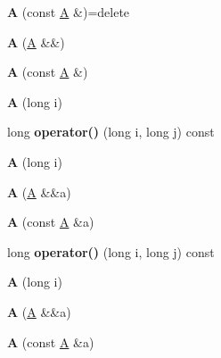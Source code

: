 \begin{DoxyCompactItemize}
\item 
\mbox{\label{struct_a_a3efa3cc940e11db7f64ddf0834c89505}} 
{\bfseries A} (const \mbox{\hyperlink{struct_a}{A}} \&)=delete
\item 
\mbox{\label{struct_a_acca238104bcc99be54892ccc0b10375a}} 
{\bfseries A} (\mbox{\hyperlink{struct_a}{A}} \&\&)
\item 
\mbox{\label{struct_a_aa0f98784263c664c8e73441c1ec951b8}} 
{\bfseries A} (const \mbox{\hyperlink{struct_a}{A}} \&)
\item 
\mbox{\label{struct_a_a770cd2af7b6878f9d1ab52ed28536341}} 
{\bfseries A} (long i)
\item 
\mbox{\label{struct_a_a82a55c3fc46f9cbb74868e6794d9ddf0}} 
long {\bfseries operator()} (long i, long j) const
\item 
\mbox{\label{struct_a_a770cd2af7b6878f9d1ab52ed28536341}} 
{\bfseries A} (long i)
\item 
\mbox{\label{struct_a_a555abbc9957aef9d50890bd343c5f2fe}} 
{\bfseries A} (\mbox{\hyperlink{struct_a}{A}} \&\&a)
\item 
\mbox{\label{struct_a_a5fe2ed5fdc0b213ea758eeb9c12d5a96}} 
{\bfseries A} (const \mbox{\hyperlink{struct_a}{A}} \&a)
\item 
\mbox{\label{struct_a_a82a55c3fc46f9cbb74868e6794d9ddf0}} 
long {\bfseries operator()} (long i, long j) const
\item 
\mbox{\label{struct_a_a770cd2af7b6878f9d1ab52ed28536341}} 
{\bfseries A} (long i)
\item 
\mbox{\label{struct_a_a555abbc9957aef9d50890bd343c5f2fe}} 
{\bfseries A} (\mbox{\hyperlink{struct_a}{A}} \&\&a)
\item 
\mbox{\label{struct_a_a5fe2ed5fdc0b213ea758eeb9c12d5a96}} 
{\bfseries A} (const \mbox{\hyperlink{struct_a}{A}} \&a)
\item 
\mbox{\label{struct_a_a82a55c3fc46f9cbb74868e6794d9ddf0}} 

\end{DoxyCompactItemize}
